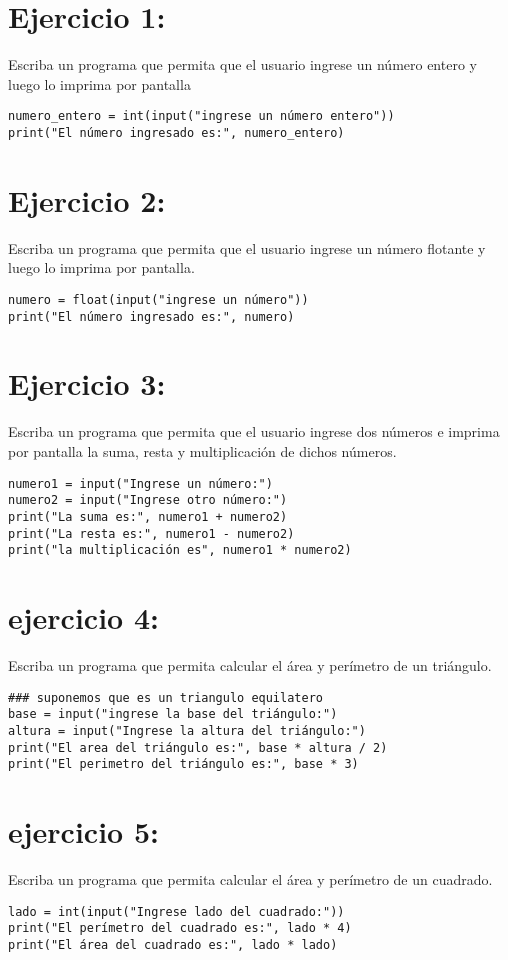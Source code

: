 \documentclass[11pt]{article}
\date{\today}
\title{}
\begin{document}
\tableofcontents

\section{Ejercicio 1:}
\label{sec:org2011be5}
Escriba un programa que permita que el usuario ingrese un
número entero y luego lo imprima por pantalla
\begin{verbatim}
numero_entero = int(input("ingrese un número entero"))
print("El número ingresado es:", numero_entero)
\end{verbatim}
\section{Ejercicio 2:}
\label{sec:orgd9ae5cc}
Escriba un programa que permita que el usuario ingrese un
número flotante y luego lo imprima por pantalla.
\begin{verbatim}
numero = float(input("ingrese un número"))
print("El número ingresado es:", numero)
\end{verbatim}
\section{Ejercicio 3:}
\label{sec:org22b7e39}
Escriba un programa que permita que el usuario ingrese dos
números e imprima por pantalla la suma, resta y multiplicación de
dichos números.
\begin{verbatim}
numero1 = input("Ingrese un número:")
numero2 = input("Ingrese otro número:")
print("La suma es:", numero1 + numero2)
print("La resta es:", numero1 - numero2)
print("la multiplicación es", numero1 * numero2)
\end{verbatim}
\section{ejercicio 4:}
\label{sec:org2e3e49c}
Escriba un programa que permita calcular el área y perímetro
de un triángulo.
\begin{verbatim}
### suponemos que es un triangulo equilatero
base = input("ingrese la base del triángulo:")
altura = input("Ingrese la altura del triángulo:")
print("El area del triángulo es:", base * altura / 2)
print("El perimetro del triángulo es:", base * 3)
\end{verbatim}
\section{ejercicio 5:}
\label{sec:orgce939f8}
Escriba un programa que permita calcular el área y perímetro
de un cuadrado.
\begin{verbatim}
lado = int(input("Ingrese lado del cuadrado:"))
print("El perímetro del cuadrado es:", lado * 4)
print("El área del cuadrado es:", lado * lado)
\end{verbatim}
\end{document}

